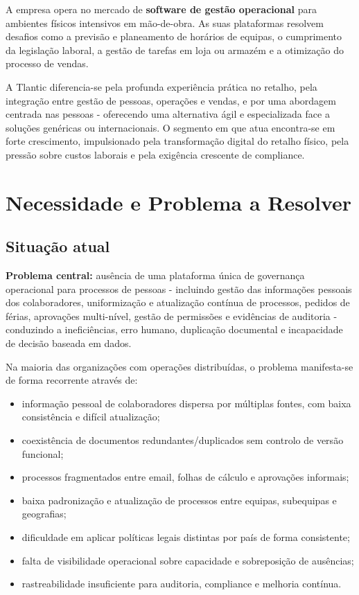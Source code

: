 \documentclass[11pt,a4paper,twoside]{article}
\begin{document}
A empresa opera no mercado de \textbf{software de gestão operacional} para ambientes físicos intensivos em mão-de-obra. As suas plataformas resolvem desafios como a previsão e planeamento de horários de equipas, o cumprimento da legislação laboral, a gestão de tarefas em loja ou armazém e a otimização do processo de vendas.

A Tlantic diferencia-se pela profunda experiência prática no retalho, pela integração entre gestão de pessoas, operações e vendas, e por uma abordagem centrada nas pessoas - oferecendo uma alternativa ágil e especializada face a soluções genéricas ou internacionais. O segmento em que atua encontra-se em forte crescimento, impulsionado pela transformação digital do retalho físico, pela pressão sobre custos laborais e pela exigência crescente de compliance.

\section{Necessidade e Problema a Resolver}

\subsection{Situação atual}

\begin{callout}
\textbf{Problema central:} ausência de uma plataforma única de governança operacional para processos de pessoas - incluindo gestão das informações pessoais dos colaboradores, uniformização e atualização contínua de processos, pedidos de férias, aprovações multi-nível, gestão de permissões e evidências de auditoria - conduzindo a ineficiências, erro humano, duplicação documental e incapacidade de decisão baseada em dados.
\end{callout}

Na maioria das organizações com operações distribuídas, o problema manifesta-se de forma recorrente através de:

\begin{itemize}
  \item informação pessoal de colaboradores dispersa por múltiplas fontes, com baixa consistência e difícil atualização;
  \item coexistência de documentos redundantes/duplicados sem controlo de versão funcional;
  \item processos fragmentados entre email, folhas de cálculo e aprovações informais;
  \item baixa padronização e atualização de processos entre equipas, subequipas e geografias;
  \item dificuldade em aplicar políticas legais distintas por país de forma consistente;
  \item falta de visibilidade operacional sobre capacidade e sobreposição de ausências;
  \item rastreabilidade insuficiente para auditoria, compliance e melhoria contínua.
\end{itemize}
\end{document}
